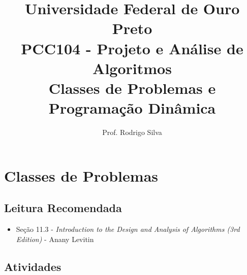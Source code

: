 \documentclass{article}
\title{\vspace{-2 cm}Universidade Federal de Ouro Preto \\ PCC104 - Projeto e Análise de Algoritmos \\Classes de Problemas e Programação Dinâmica}
\author{Prof. Rodrigo Silva}
\begin{document}
\maketitle

\section{Classes de Problemas}

\subsection{Leitura Recomendada}

\begin{itemize}
    \item Seção 11.3 - \textit{Introduction to the Design and Analysis of Algorithms (3rd Edition)} - Anany Levitin 
\end{itemize}

\subsection{Atividades}
\end{document}
